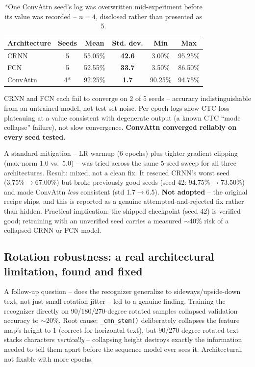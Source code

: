\documentclass[11pt]{article}
\begin{document}
\begin{table}[H]
\centering
\begin{tabular}{@{}lccccc@{}}
\toprule
\textbf{Architecture} & \textbf{Seeds} & \textbf{Mean} & \textbf{Std. dev.} & \textbf{Min} & \textbf{Max} \\
\midrule
CRNN & 5 & 55.05\% & \textbf{42.6} & 3.00\% & 95.25\% \\
FCN & 5 & 52.55\% & \textbf{33.7} & 3.50\% & 86.50\% \\
ConvAttn & 4* & 92.25\% & \textbf{1.7} & 90.25\% & 94.75\% \\
\bottomrule
\end{tabular}
\caption{*One ConvAttn seed's log was overwritten mid-experiment before its value was
recorded -- $n=4$, disclosed rather than presented as 5.}
\end{table}

CRNN and FCN each fail to converge on 2 of 5 seeds -- accuracy indistinguishable from
an untrained model, not test-set noise. Per-epoch logs show CTC loss plateauing at a
value consistent with degenerate output (a known CTC ``mode collapse'' failure), not
slow convergence. \textbf{ConvAttn converged reliably on every seed tested.}

A standard mitigation -- LR warmup (6 epochs) plus tighter gradient clipping
(max-norm 1.0 vs.\ 5.0) -- was tried across the same 5-seed sweep for all three
architectures. Result: mixed, not a clean fix. It rescued CRNN's worst seed
(3.75\%$\to$67.00\%) but broke previously-good seeds (seed 42: 94.75\%$\to$73.50\%)
and made ConvAttn \emph{less} consistent (std 1.7$\to$6.5). \textbf{Not adopted} -- the
original recipe ships, and this is reported as a genuine attempted-and-rejected fix
rather than hidden. Practical implication: the shipped checkpoint (seed 42) is
verified good; retraining with an unverified seed carries a measured $\sim$40\% risk
of a collapsed CRNN or FCN model.

\subsection{Rotation robustness: a real architectural limitation, found and fixed}

A follow-up question -- does the recognizer generalize to sideways/upside-down text,
not just small rotation jitter -- led to a genuine finding. Training the recognizer
directly on 90/180/270-degree rotated samples collapsed validation accuracy to
$\sim$20\%. Root cause: \texttt{\_cnn\_stem()} deliberately collapses the feature
map's height to 1 (correct for horizontal text), but 90/270-degree rotated text stacks
characters \emph{vertically} -- collapsing height destroys exactly the information
needed to tell them apart before the sequence model ever sees it. Architectural, not
fixable with more epochs.
\end{document}
